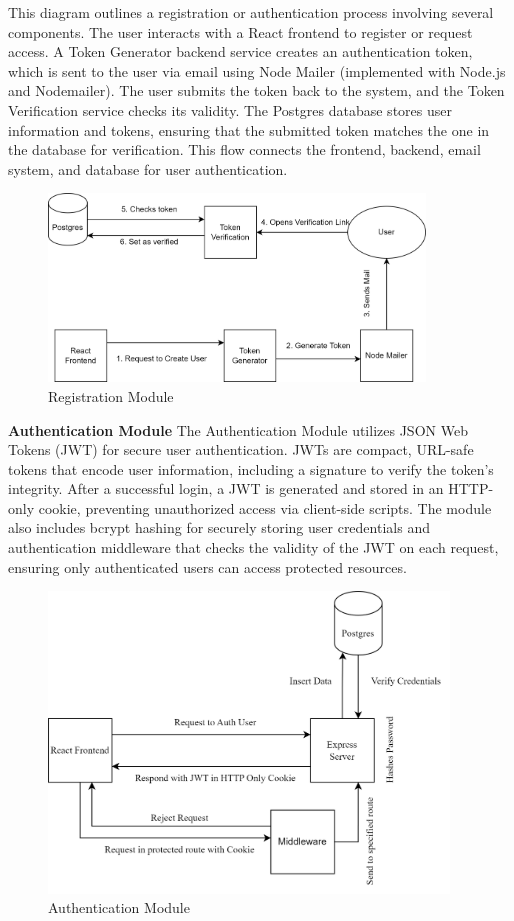 This diagram outlines a registration or authentication process involving several components. The user interacts with a React frontend to register or request access. A Token Generator backend service creates an authentication token, which is sent to the user via email using Node Mailer (implemented with Node.js and Nodemailer). The user submits the token back to the system, and the Token Verification service checks its validity. The Postgres database stores user information and tokens, ensuring that the submitted token matches the one in the database for verification. This flow connects the frontend, backend, email system, and database for user authentication.
\begin{figure}[H]
    \centering
     \includegraphics[height = 5cm]{Diagrams/register_module.png}
     \caption{Registration Module}
 \end{figure}
\textbf{Authentication Module}
\newline
The Authentication Module utilizes JSON Web Tokens (JWT) for secure user authentication. JWTs are compact, URL-safe tokens that encode user information, including a signature to verify the token's integrity. After a successful login, a JWT is generated and stored in an HTTP-only cookie, preventing unauthorized access via client-side scripts. The module also includes bcrypt hashing for securely storing user credentials and authentication middleware that checks the validity of the JWT on each request, ensuring only authenticated users can access protected resources.
\begin{figure}[H]
   \centering
    \includegraphics[height = 8cm]{Diagrams/auth module.png}
    \caption{Authentication Module}
\end{figure}

